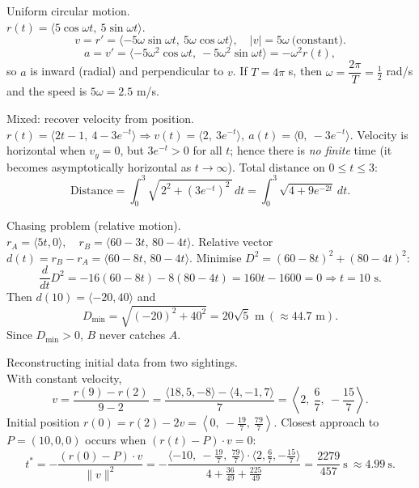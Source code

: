 \documentclass[11pt]{article}
\def\textbf#1{#1}%
\def\mathbf#1{#1}%
\begin{document}
\begin{solution}
\textbf{Uniform circular motion.}\\
\(\mathbf{r}(t)=\langle5\cos\omega t,\ 5\sin\omega t\rangle\).
\[
\mathbf{v}=\mathbf{r}'=\langle-5\omega\sin\omega t,\ 5\omega\cos\omega t\rangle,\quad
|\mathbf{v}|=5\omega\ \text{(constant)}.
\]
\[
\mathbf{a}=\mathbf{v}'=\langle-5\omega^2\cos\omega t,\ -5\omega^2\sin\omega t\rangle
=-\omega^2\mathbf{r}(t),
\]
so \(\mathbf{a}\) is inward (radial) and perpendicular to \(\mathbf{v}\).  
If \(T=4\pi\) s, then \(\omega=\dfrac{2\pi}{T}=\tfrac12\) rad/s and the speed is \(5\omega=2.5\) m/s.
\end{solution}

\begin{solution}
\textbf{Mixed: recover velocity from position.}\\
\(\mathbf{r}(t)=\langle 2t-1,\ 4-3e^{-t}\rangle\Rightarrow
\mathbf{v}(t)=\langle2,\ 3e^{-t}\rangle,\ 
\mathbf{a}(t)=\langle0,\ -3e^{-t}\rangle.\)
Velocity is horizontal when \(v_y=0\), but \(3e^{-t}>0\) for all \(t\); hence there is \emph{no finite} time (it becomes asymptotically horizontal as \(t\to\infty\)).  
Total distance on \(0\le t\le3\):
\[
\text{Distance}=\int_{0}^{3}\!\sqrt{\,2^2+(3e^{-t})^2\,}\,dt=\int_{0}^{3}\sqrt{4+9e^{-2t}}\,dt.
\]
\end{solution}

\begin{solution}
\textbf{Chasing problem (relative motion).}\\
\(\mathbf{r}_A=\langle5t,0\rangle,\quad \mathbf{r}_B=\langle60-3t,\,80-4t\rangle.\)
Relative vector \(\mathbf{d}(t)=\mathbf{r}_B-\mathbf{r}_A=\langle60-8t,\,80-4t\rangle\).  
Minimise \(D^2=(60-8t)^2+(80-4t)^2\):
\[
\frac{d}{dt}D^2=-16(60-8t)-8(80-4t)=160t-1600=0\Rightarrow t=10\text{ s}.
\]
Then \(\mathbf{d}(10)=\langle-20,40\rangle\) and
\[
D_{\min}=\sqrt{(-20)^2+40^2}=20\sqrt{5}\text{ m}\ (\approx44.7\text{ m}).
\]
Since \(D_{\min}>0\), \(B\) never catches \(A\).
\end{solution}

\begin{solution}
\textbf{Reconstructing initial data from two sightings.}\\
With constant velocity,
\[
\mathbf{v}=\frac{\mathbf{r}(9)-\mathbf{r}(2)}{9-2}
=\frac{\langle18,5,-8\rangle-\langle4,-1,7\rangle}{7}
=\left\langle 2,\ \frac{6}{7},\ -\frac{15}{7}\right\rangle.
\]
Initial position \(\mathbf{r}(0)=\mathbf{r}(2)-2\mathbf{v}
=\left\langle 0,\ -\frac{19}{7},\ \frac{79}{7}\right\rangle.\)
Closest approach to \(P=(10,0,0)\) occurs when \((\mathbf{r}(t)-P)\cdot\mathbf{v}=0\):
\[
t^*=-\frac{(\mathbf{r}(0)-P)\cdot\mathbf{v}}{\|\mathbf{v}\|^2}
=-\frac{\langle-10,\ -\frac{19}{7},\ \frac{79}{7}\rangle\!\cdot\!\langle2,\frac{6}{7},-\frac{15}{7}\rangle}
{4+\frac{36}{49}+\frac{225}{49}}
=\frac{2279}{457}\ \text{s}\ \approx 4.99\ \text{s}.
\]
\end{solution}
\end{document}
